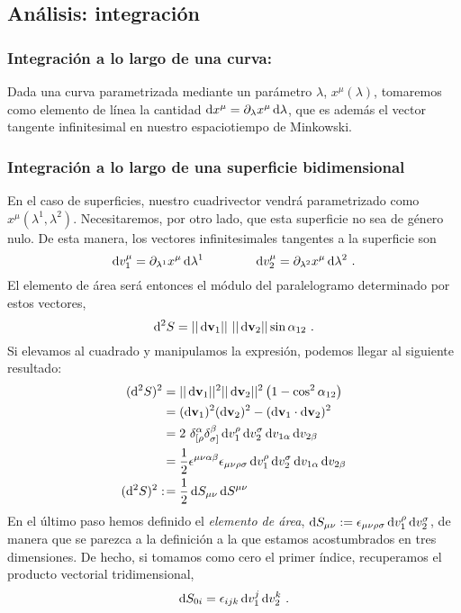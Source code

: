 \subsection{Análisis: integración}
\subsubsection{Integración a lo largo de una curva:}
Dada una curva parametrizada mediante un parámetro $\lambda$, $x^\mu (\lambda)$, tomaremos como elemento de línea la cantidad $\D{x^\mu} = \partial_\lambda x^\mu \D{\lambda}$, que es además el vector tangente infinitesimal en nuestro espaciotiempo de Minkowski. 
\subsubsection{Integración a lo largo de una superficie bidimensional}
En el caso de superficies, nuestro cuadrivector vendrá parametrizado como $x^\mu (\lambda^1,\lambda^2)$. Necesitaremos, por otro lado, que esta superficie no sea de género nulo. De esta manera, los vectores infinitesimales tangentes a la superficie son 
$$
\D{{v}}_1^\mu = \partial_{\lambda^1}x^\mu \D{\lambda^1} \qquad \qquad \D{{v}}_2^\mu = \partial_{\lambda^2}x^\mu \D{\lambda^2} \ .
$$
El elemento de área será entonces el módulo del paralelogramo determinado por estos vectores, 
$$
\D[2]{S} = ||\D{\B{v}_1}||\ ||\D{\B{v}_2}|| \sin \alpha_{12} \ .
$$
Si elevamos al cuadrado y manipulamos la expresión, podemos llegar al siguiente resultado:
\begin{equation*}
    \begin{split}
        (\D[2]{S})^2 &= ||\D{\B{v}_1}||^2 ||\D{\B{v}_2}||^2 \left (1-\cos^2 \alpha _{12}\right ) \\
                     &= (\D{\B{v}_1})^2 (\D{\B{v}_2})^2 - (\D{\B{v}_1}\cdot \D{\B{v}_2})^2 \\
                     &= 2\ \var ^\alpha _{[\rho} \var^\beta _{\sigma ]} \D{v_1^\rho ,v_2^\sigma , v_{1\alpha }, v_{2\beta }} \\
                     &= \frac{1}{2} \epsilon^{\mu \nu \alpha \beta  } \epsilon_{\mu \nu \rho \sigma } \D{v_1^\rho ,v_2^\sigma , v_{1\alpha }, v_{2\beta }} \\
    (\D[2]{S})^2  :\!&= \frac{1}{2} \D{S_{\mu \nu },S^{\mu \nu }}  
    \end{split}
\end{equation*}
En el último paso hemos definido el \emph{elemento de área}, $\D{S_{\mu \nu }} := \epsilon_{\mu \nu \rho \sigma }\D{v_1^\rho ,v_2^\sigma}$, de manera que se parezca a la definición a la que estamos acostumbrados en tres dimensiones. De hecho, si tomamos como cero el primer índice, recuperamos el producto vectorial tridimensional, 
$$
\D{S_{0i}} = \epsilon_{ijk} \D{v_1^j,v_2^k} \ .
$$
